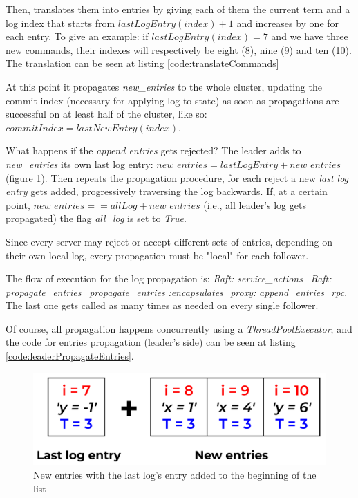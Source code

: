 Then, translates them into entries by giving each of them the current term and a log index that starts from $lastLogEntry(index) + 1$ and increases by one for each entry. To give an example: if $lastLogEntry(index) = 7$ and we have three new commands, their indexes will respectively be eight (8), nine (9) and ten (10). The translation can be seen at listing \ref{code:translateCommands}

At this point it propagates \textit{new\_entries} to the whole cluster, updating the commit index (necessary for applying log to state) as soon as propagations are successful on at least half of the cluster, like so: $commitIndex = lastNewEntry(index)$. 

What happens if the \textit{append entries} gets rejected? The leader adds to \textit{new\_entries} its own last log entry: $new\_entries = lastLogEntry + new\_entries$ (figure \ref{fig:newEntries}). Then repeats the propagation procedure, for each reject a new \textit{last log entry} gets added, progressively traversing the log backwards. If, at a certain point, $new\_entries == allLog + new\_entries$ (i.e., all leader's log gets propagated) the flag \textit{all\_log} is set to \textit{True}. 

Since every server may reject or accept different sets of entries, depending on their own local log, every propagation must be "local" for each follower. 

The flow of execution for the log propagation is: \textit{Raft: service\_actions} \faArrowRight\ \textit{Raft: propagate\_entries} \faArrowRight\ \textit{propagate\_entries} \textit{:encapsulates\_proxy:} \textit{append\_entries\_rpc}. The last one gets called as many times as needed on every single follower.

Of course, all propagation happens concurrently using a \textit{ThreadPoolExecutor}, and the code for entries propagation (leader's side) can be seen at listing \ref{code:leaderPropagateEntries}.

\begin{figure}[h]
  \centering
  \includegraphics[width=.8\linewidth]{images/newEntries.png}
  
  \caption{New entries with the last log's entry added to the beginning of the list}
  \label{fig:newEntries}
\end{figure}

